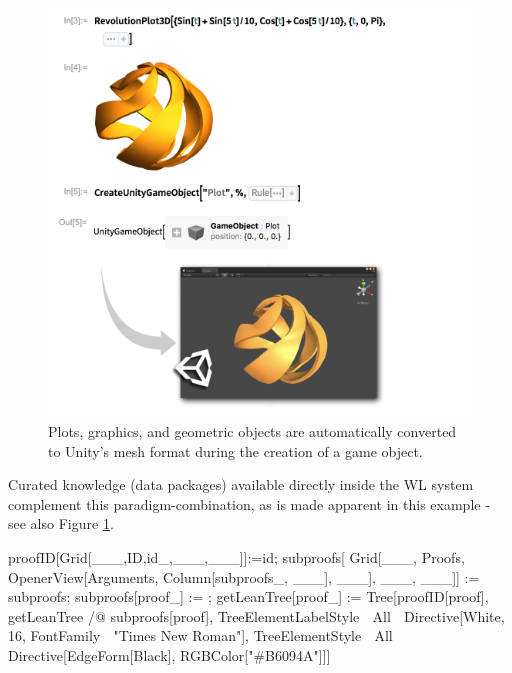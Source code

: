 \begin{figure}[h]
    \centering
    \includegraphics[scale=0.5]{images/theory/unity.png}
    \caption{Plots, graphics, and geometric objects are automatically converted to Unity's mesh format during the creation of a game object.\cite{noauthor_highlevel_nodate}}
    \label{fig:unity}
\end{figure}

Curated knowledge (data packages) available directly inside the WL system complement this paradigm-combination, as is made apparent in this example - see also Figure \ref{fig:unity}.

\begin{program}
\caption{These functions extract a tree data structure in the form of certain integer mathematical proof IDs and the related children IDs from a grid expression in WL and serve well to illustrate lists and replacements, functional and rule-based programming, as well as recursion, for efficient implementations. An expose with details is part of the appendix in the present work. \ref{app:Expose}}
\label{treeProgram}
\begin{LaTeXCode}
proofID[Grid[{___,{ID,id_},___},___]]:=id;
subproofs[
Grid[{___, {Proofs, OpenerView[{Arguments, Column[subproofs_, ___]}, ___]}, ___},
___]] := subproofs; subproofs[proof_] := {};
getLeanTree[proof_] := Tree[proofID[proof], getLeanTree /@ subproofs[proof], TreeElementLabelStyle  All  Directive[White, 16, FontFamily  "Times New Roman"], TreeElementStyle  All  Directive[EdgeForm[Black], RGBColor["#B6094A"]]]
\end{LaTeXCode}
\end{program}

